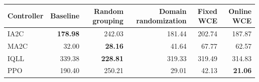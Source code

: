 \begin{tabular}{lrrrrr}
\hline
Controller & Baseline & Random grouping & Domain randomization & Fixed WCE & Online WCE \\
\hline
IA2C & \textbf{178.98} & 242.03 & 181.44 & 202.74 & 187.87 \\
MA2C & 32.00 & \textbf{28.16} & 41.64 & 67.77 & 62.57 \\
IQLL & 339.38 & \textbf{228.81} & 319.33 & 319.49 & 314.83 \\
PPO & 190.40 & 250.21 & 29.01 & 42.13 & \textbf{21.06} \\
\hline
\end{tabular}
